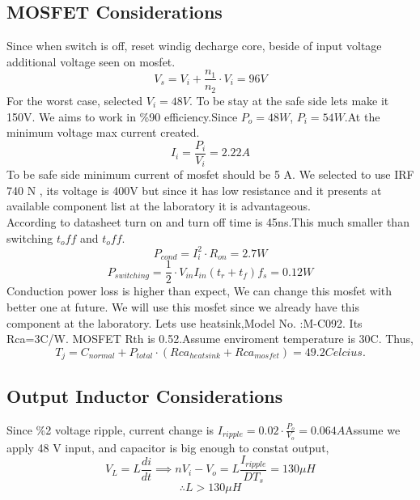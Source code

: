 \documentclass{article}
\begin{document}
\subsection{MOSFET Considerations}
Since when switch is off, reset windig decharge core, beside of input voltage additional voltage seen on mosfet.
\begin{equation}
    V_s=V_i+\frac{n_1}{n_2}\cdot V_i=96 V
\end{equation}
For the worst case, selected $V_i=48V$. To be stay at the safe side lets make it 150V.
We aims to work in \%90 efficiency.Since $P_o=48 W$, $P_i=54 W$.At the minimum voltage max current created.
\begin{equation}
    I_i=\frac{P_i}{V_i}=2.22 A
\end{equation}
To be safe side minimum current of mosfet should be 5 A.
We selected to use IRF 740 N \cite{mosfet}, its voltage is 400V but since it has low resistance and it presents at available component list at the laboratory it is advantageous.
\\According to datasheet turn on and turn off time is 45ns.This much smaller than switching $t_off$ and $t_off$.
\begin{equation}
    P_{cond}=I_{i}^2\cdot R_{on}=2.7 W
\end{equation}
\begin{equation}
    P_{switching}=\frac{1}{2}\cdot V_{in}I_{in}(t_r+t_f)f_s=0.12W
\end{equation}
Conduction power loss is higher than expect, We can change this mosfet with better one at future. We will use this mosfet since we already have this component at the laboratory.
Lets use heatsink,Model No. :M-C092. Its Rca=3C/W. MOSFET Rth is 0.52.Assume enviroment temperature is 30C. Thus,
\begin{equation}
    T_j=C_{normal}+P_{total}\cdot (Rca_{heatsink}+ Rca_{mosfet})=49.2 Celcius.
\end{equation}
\subsection{Output Inductor Considerations}
Since \%2 voltage ripple, current change is $I_{ripple}=0.02\cdot \frac{P_o}{V_o}=0.064 A$Assume we apply 48 V input, and capacitor is big enough to constat output,
\begin{equation}
    V_L=L\frac{di}{dt} \implies nV_i-V_o=L\frac{I_{ripple}}{DT_s}=130\mu H
\end{equation}
\[\therefore L>130\mu H\]
\end{document}
